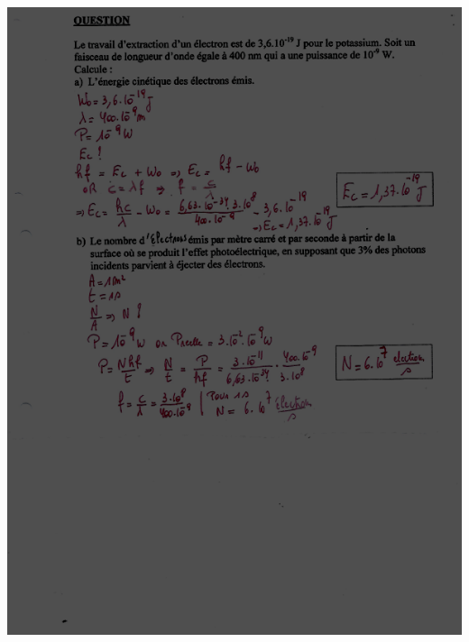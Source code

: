{{{\includegraphics[width=17.498cm,height=24.13cm]{Pictures/10000001000002570000033B4A6387CB4865E463.png}

}}}
